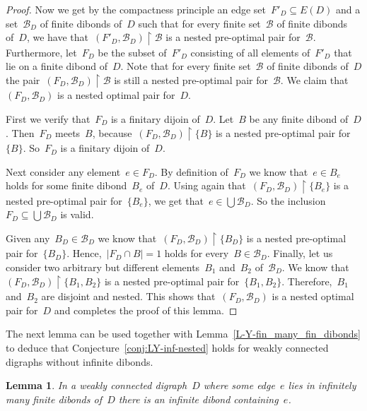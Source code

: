 \documentclass[reqno, 12pt]{amsart}
\numberwithin{equation}{section}
\numberwithin{figure}{section}
\theoremstyle{plain}
\newtheorem{lemma}[thm]{Lemma}
\theoremstyle{definition}
\newcommand{\restricted}{\ensuremath{{\upharpoonright}}}
\newcommand{\abs}[1]{\ensuremath{{\lvert {#1} \rvert}}}
\begin{document}
\begin{proof}
    Now we get by the compactness principle an edge set~${F'_D \subseteq E(D)}$ and a set~$\mathcal{B}_D$ of finite dibonds of~$D$ 
    such that
    for every finite set~$\mathcal{B}$ of finite dibonds of~$D$, we have that~${(F'_D, \mathcal{B}_D) \restricted \mathcal{B}}$
    is a nested pre-optimal pair 
    for~$\mathcal{B}$.
    Furthermore, 
    let~$F_D$ be the subset of~$F'_D$ consisting of all elements of~$F'_D$ that lie on a finite dibond of~$D$. 
    Note that for every finite set~$\mathcal{B}$ of finite dibonds of~$D$ the pair~$(F_D, \mathcal{B}_D) \restricted \mathcal{B}$ is still a nested pre-optimal pair 
    for~$\mathcal{B}$. 
    We claim that~${(F_D, \mathcal{B}_D)}$ is a nested optimal pair for~$D$. 
    
    First we verify that~$F_D$ is a finitary dijoin of~$D$. 
    Let~$B$ be any finite dibond of~$D$. 
    Then~$F_D$ meets~$B$, 
    because~${(F_D, \mathcal{B}_D) \restricted \{B\}}$ 
    is a nested pre-optimal pair for~${\{B\}}$. 
    So~$F_D$ is a finitary dijoin of~$D$. 
    
    Next consider any element~${e \in F_D}$. 
    By definition of~$F_D$ we know that~${e \in B_e}$ holds for some finite dibond~$B_e$ of~$D$. 
    Using again 
    that~${(F_D,\mathcal{B}_D) \restricted \{B_e\}}$
    is a nested pre-optimal pair for~${\{B_e\}}$, we get that~${e \in \bigcup \mathcal{B}_D}$. 
    So the inclusion~${F_D \subseteq \bigcup \mathcal{B}_D}$ is valid. 
    
    Given any~${B_D \in \mathcal{B}_D}$ we know 
    that~${(F_D, \mathcal{B}_D) \restricted \{B_D\}}$ 
    is a nested pre-optimal pair for~${\{B_D\}}$. 
    Hence,~${\abs{F_D \cap B} = 1}$ holds for every~${B \in \mathcal{B}_D}$.     
    Finally, let us consider two arbitrary but different elements~$B_1$ and~$B_2$ of~$\mathcal{B}_D$. 
    We know 
    that~${(F_D, \mathcal{B}_D) \restricted \{B_1, B_2\}}$ 
    is a nested pre-optimal pair for~${\{B_1, B_2\}}$. 
    Therefore,~$B_1$ and~$B_2$ are disjoint and nested. 
    This shows that~${(F_D, \mathcal{B}_D)}$ is a nested optimal pair for~$D$ and completes the proof of this lemma. 
\end{proof}

The next lemma can be used together with Lemma~\ref{L-Y-fin_many_fin_dibonds} to deduce that Conjecture~\ref{conj:LY-inf-nested} holds for weakly connected digraphs without infinite dibonds.

\begin{lemma}
    \label{lem:inf-many-fin-dibonds->inf-dicut}
    In a weakly connected digraph~$D$ where some edge~$e$ lies in infinitely many finite dibonds of~$D$ there is an infinite dibond containing~$e$.
\end{lemma}
\end{document}
